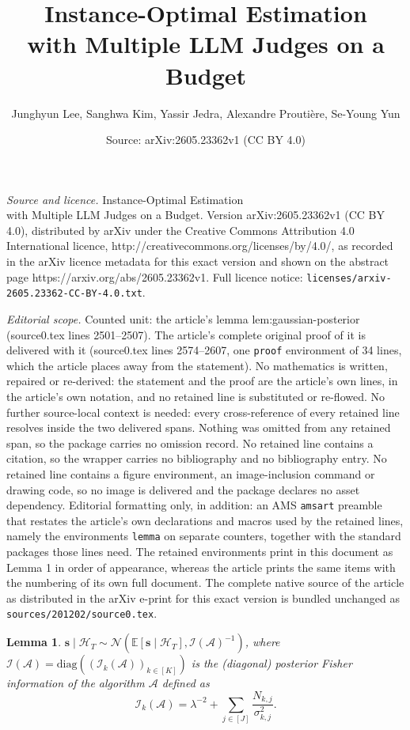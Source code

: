 \documentclass[10pt,a4paper]{amsart}
\title{Instance-Optimal Estimation \\ with Multiple LLM Judges on a Budget}
\author{Junghyun Lee, Sanghwa Kim, Yassir Jedra, Alexandre Prouti\`ere, Se-Young Yun}
\date{Source: arXiv:2605.23362v1 (CC BY 4.0)}
\newtheorem{lemma}{Lemma}
\newcommand{\E}{\mathbb{E}}
\def\gA{{\mathcal{A}}}
\def\gH{{\mathcal{H}}}
\def\gI{{\mathcal{I}}}
\def\gN{{\mathcal{N}}}
\def\vs{{\bm{s}}}
\begin{document}
\maketitle

\noindent\emph{Source and licence.} Instance-Optimal Estimation \\ with Multiple LLM Judges on a Budget. Version arXiv:2605.23362v1 (CC BY 4.0), distributed by arXiv under the Creative Commons Attribution 4.0 International licence, http://creativecommons.org/licenses/by/4.0/, as recorded in the arXiv licence metadata for this exact version and shown on the abstract page https://arxiv.org/abs/2605.23362v1. Full licence notice: \texttt{licenses/arxiv-2605.23362-CC-BY-4.0.txt}.\par\smallskip

\noindent\textit{Editorial scope.} Counted unit: the article's lemma lem:gaussian-posterior (source0.tex lines 2501--2507). The article's complete original proof of it is delivered with it (source0.tex lines 2574--2607, one \texttt{proof} environment of 34 lines, which the article places away from the statement). No mathematics is written, repaired or re-derived: the statement and the proof are the article's own lines, in the article's own notation, and no retained line is substituted or re-flowed.  No further source-local context is needed: every cross-reference of every retained line resolves inside the two delivered spans.  Nothing was omitted from any retained span, so the package carries no omission record.  No retained line contains a citation, so the wrapper carries no bibliography and no bibliography entry.  No retained line contains a figure environment, an image-inclusion command or drawing code, so no image is delivered and the package declares no asset dependency.  Editorial formatting only, in addition: an AMS \texttt{amsart} preamble that restates the article's own declarations and macros used by the retained lines, namely the environments \texttt{lemma} on separate counters, together with the standard packages those lines need.  The retained environments print in this document as Lemma 1 in order of appearance, whereas the article prints the same items with the numbering of its own full document.  The complete native source of the article as distributed in the arXiv e-print for this exact version is bundled unchanged as \texttt{sources/201202/source0.tex}.
\begin{lemma}
\label{lem:gaussian-posterior}
    $\vs \mid \gH_T \sim \gN(\E[\vs \mid \gH_T], \gI(\gA)^{-1})$, where $\gI(\gA) = \mathrm{diag}\left( (\gI_k(\gA))_{k \in [K]} \right)$ is the (diagonal) posterior Fisher information of the algorithm $\gA$ defined as
    \begin{equation}
        \gI_k(\gA) = \lambda^{-2} +\sum_{j \in [J]} \frac{N_{k,j}}{\sigma_{k,j}^2}.
    \end{equation}
\end{lemma}
\end{document}
